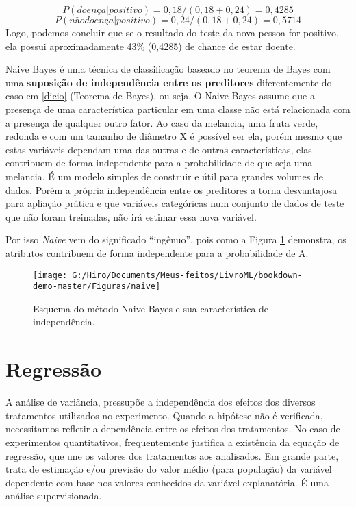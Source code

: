 \documentclass[
  openany]{book}
\begin{document}
\[P(doença|positivo) = 0,18/(0,18+0,24) = 0,4285\]
\[P(não doença|positivo) = 0,24/(0,18+0,24) = 0,5714\]
Logo, podemos concluir que se o resultado do teste da nova pessoa for positivo, ela possui aproximadamente 43\% (0,4285) de chance de estar doente.

Naive Bayes é uma técnica de classificação baseado no teorema de Bayes com uma \textbf{suposição de independência entre os preditores} diferentemente do caso em \ref{dicio} (Teorema de Bayes), ou seja, O Naive Bayes assume que a presença de uma característica particular em uma classe não está relacionada com a presença de qualquer outro fator. Ao caso da melancia, uma fruta verde, redonda e com um tamanho de diâmetro X é possível ser ela, porém mesmo que estas variáveis dependam uma das outras e de outras características, elas contribuem de forma independente para a probabilidade de que seja uma melancia. É um modelo simples de construir e útil para grandes volumes de dados. Porém a própria independência entre os preditores a torna desvantajosa para apliação prática e que variáveis categóricas num conjunto de dados de teste que não foram treinadas, não irá estimar essa nova variável.

Por isso \emph{Naive} vem do significado ``ingênuo'', pois como a Figura \ref{fig:naive} demonstra, os atributos contribuem de forma independente para a probabilidade de A.

\begin{figure}

{\centering \texttt{[image: G:/Hiro/Documents/Meus-feitos/LivroML/bookdown-demo-master/Figuras/naive]} 

}

\caption{Esquema do método Naive Bayes e sua característica de independência.}\label{fig:naive}
\end{figure}



\hypertarget{reg}{%
\section{Regressão}\label{reg}}

A análise de variância, pressupõe a independência dos efeitos dos diversos tratamentos utilizados no experimento. Quando a hipótese não é verificada, necessitamos refletir a dependência entre os efeitos dos tratamentos. No caso de experimentos quantitativos, frequentemente justifica a existência da equação de regressão, que une os valores dos tratamentos aos analisados. Em grande parte, trata de estimação e/ou previsão do valor médio (para população) da variável dependente com base nos valores conhecidos da variável explanatória. É uma análise supervisionada.
\end{document}
